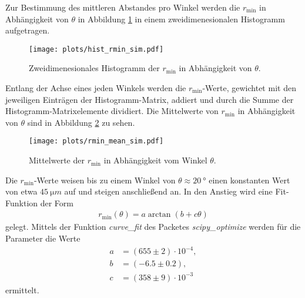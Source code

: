 Zur Bestimmung des mittleren Abstandes pro Winkel werden die $r_{\mathrm{min}}$ in Abhängigkeit von $\theta$ in Abbildung \ref{fig:Hist_rmin_sim} in einem zweidimenesionalen Histogramm aufgetragen.
\begin{figure}
    \centering
    \texttt{[image: plots/hist\_rmin\_sim.pdf]}
    \caption{Zweidimenesionales Histogramm der $r_{\mathrm{min}}$ in Abhängigkeit von $\theta$.}
    \label{fig:Hist_rmin_sim}
\end{figure}
\FloatBarrier
Entlang der Achse eines jeden Winkels werden die $r_{\mathrm{min}}$-Werte, gewichtet mit den jeweiligen Einträgen der Histogramm-Matrix, addiert und durch die Summe der Histogramm-Matrixelemente dividiert. Die Mittelwerte von $r_{\mathrm{min}}$ in Abhängigkeit von $\theta$ sind in Abbildung \ref{fig:rmin_mean_sim} zu sehen.
\begin{figure}
    \centering
    \texttt{[image: plots/rmin\_mean\_sim.pdf]}
    \caption{Mittelwerte der $r_{\mathrm{min}}$ in Abhängigkeit vom Winkel $\theta$. }
    \label{fig:rmin_mean_sim}
\end{figure}
\FloatBarrier
Die $r_{\mathrm{min}}$-Werte weisen bis zu einem Winkel von $\theta \approx \SI{20}{°}$ einen konstanten Wert von etwa $\SI{45}{\micro m}$ auf und steigen anschließend an.
In den Anstieg wird eine Fit-Funktion der Form
\begin{align}
    r_{\mathrm{min}}(\theta) = a \arctan(b + c \theta)
\end{align}
gelegt.
Mittels der Funktion \textit{curve\_fit} des Packetes \textit{scipy\_optimize} werden für die Parameter die Werte
\begin{align*}
    a &= (655 \pm 2)\cdot 10^{-4} ,\\
    b &= (-6.5 \pm 0.2),\\
    c &= (358 \pm 9)\cdot 10^{-3}
\end{align*}
ermittelt.

